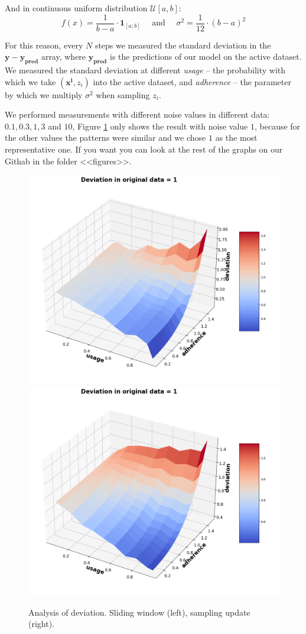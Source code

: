 \documentclass{article}
\begin{document}
        And in continuous uniform distribution $\mathcal{U}[a, b]$:
        \begin{equation*}
            f(x) = \dfrac{1}{b-a} \cdot \textbf{1}_{[a;b]} \quad \text{ and } \quad \sigma^2 = \dfrac{1}{12} \cdot (b-a)^2
        \end{equation*}

        For this reason, every $N$ steps we measured the standard deviation in the $\mathbf{y} - \mathbf{y_{\text{pred}}}$ array, where $\mathbf{y_{\text{pred}}}$ is the predictions of our model on the active dataset. We measured the standard deviation at different \textit{usage} -- the probability with which we take $(\mathbf{x^i}, z_i)$ into the active dataset, and \textit{adherence} -- the parameter by which we multiply $\sigma^2$ when sampling $z_i$. 

        We performed measurements with different noise values in different data: $0.1, 0.3, 1, 3$ and $10$, Figure \ref{3D} only shows the result with noise value $1$, because for the other values the patterns were similar and we chose $1$ as the most representative one. If you want you can look at the rest of the graphs on our Githab in the folder <<figures>>.

        \begin{figure}[h!]
            \centering
            \includegraphics[width=0.49\linewidth]{pictures/3D_plot_loop_1.png}
            \includegraphics[width=0.49\linewidth]{pictures/3D_plot_sample_1.png}
            
            \caption{Analysis of deviation. Sliding window (left), sampling update (right).}
            \label{3D}
        \end{figure}
\end{document}
